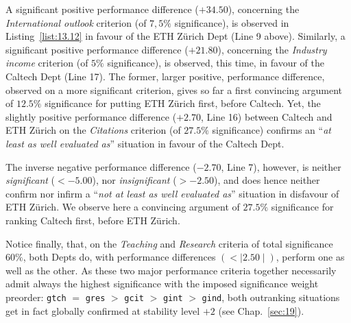 A significant positive performance difference ($+34.50$), concerning the \emph{International outlook} criterion (of $7,5\%$ significance), is observed in Listing~\vref{list:13.12} in favour of the ETH Zürich Dept (Line 9 above). Similarly, a significant positive performance difference ($+21.80$), concerning the \emph{Industry income} criterion (of $5\%$ significance), is observed, this time, in favour of the Caltech Dept (Line 17). The former, larger positive, performance difference, observed on a more significant criterion, gives so far a first convincing argument of $12.5\%$ significance for putting ETH Zürich first, before Caltech. Yet, the slightly positive performance difference ($+2.70$, Line 16) between Caltech and ETH Zürich on the \emph{Citations} criterion (of $27.5\%$ significance) confirms an ``\emph{at least as well evaluated as}'' situation in favour of the Caltech Dept.

The inverse negative performance difference ($-2.70$, Line 7), however, is neither \emph{significant} ($< -5.00$), nor \emph{insignificant} ($> -2.50$), and does hence neither confirm nor infirm a ``\emph{not at least as well evaluated as}'' situation in disfavour of ETH Zürich. We observe here a convincing argument of $27.5\%$ significance for ranking Caltech first, before ETH Zürich.

Notice finally, that, on the \emph{Teaching} and \emph{Research} criteria of total significance $60\%$, both Depts do, with performance differences $(< \mid 2.50 \mid)$, perform one as well as the other. As these two major performance criteria together necessarily admit always the highest significance with the imposed significance weight preorder: \texttt{gtch} $=$ \texttt{gres} $>$ \texttt{gcit} $>$ \texttt{gint} $>$ \texttt{gind}, both outranking situations get in fact globally confirmed at stability level $+2$ (see Chap.~\ref{sec:19}).

